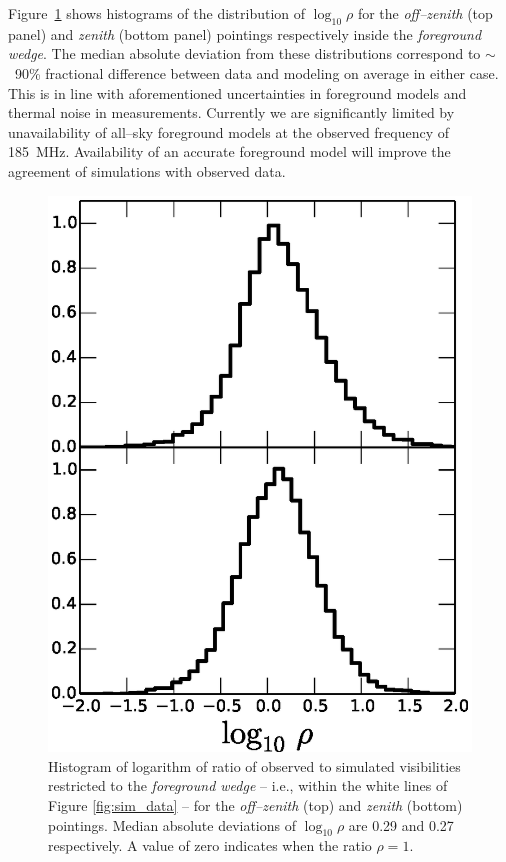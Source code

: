 \documentclass[preprint2,iop,numberedappendix]{emulateapj}
\begin{document}
Figure~\ref{fig:data-sim-ratio} shows histograms of the distribution of $\log_{10}\rho$ for the {\it off--zenith} (top panel) and {\it zenith} (bottom panel) pointings respectively inside the {\it foreground wedge}. The median absolute deviation from these distributions correspond to $\sim$~90\% fractional difference between data and modeling on average in either case. This is in line with aforementioned uncertainties in foreground models and thermal noise in measurements. Currently we are significantly limited by unavailability of all--sky foreground models at the observed frequency of 185~MHz. Availability of an accurate foreground model will improve the agreement of simulations with observed data. 

\begin{figure}[htb]
\centering
\includegraphics[width=\linewidth]{figures/v1_0/delta_array_histogram_wedge_sim_data_log_ratio_0.3m_ground_custom_gaussian_FG_model_asm_all_sky_nside_64_Tsys_90.0K_185.0_MHz_30.7_MHz_bnw2.0.eps}
\caption{Histogram of logarithm of ratio of observed to simulated visibilities restricted to the {\it foreground wedge} -- i.e., within the white lines of Figure \ref{fig:sim_data} -- for the {\it off--zenith} (top) and {\it zenith} (bottom) pointings. Median absolute deviations of $\log_{10}\rho$ are 0.29 and 0.27 respectively. A value of zero indicates when the ratio $\rho=1$. \label{fig:data-sim-ratio}}

\end{figure}
\end{document}
